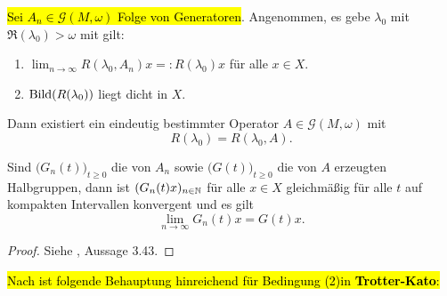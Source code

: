 \begin{fsatz}\label{Trotter-Kato}
\hl{Sei $A_n\in \mathcal G(M,\omega)$ Folge von Generatoren}. Angenommen, es gebe $\lambda_0$ mit $\mathfrak R(\lambda_0) >\omega$ mit gilt:
\begin{enumerate}
\item $\lim_{n\to\infty}R(\lambda_0, A_n)x =:R(\lambda_0)x$ für alle $x\in X$.
\item $\textnormal{Bild}(R(\lambda_0))$ liegt dicht in $X$.
\end{enumerate}
Dann existiert ein eindeutig bestimmter Operator $A\in\mathcal G(M, \omega)$ mit
\begin{equation*}
R(\lambda_0)=R(\lambda_0, A).
\end{equation*}

\par 
Sind $\big(G_n(t)\big)_{t\geq0}$ die von $A_n$ sowie $\big(G(t)\big)_{t\geq0}$ die von $A$ erzeugten Halbgruppen, dann ist $(G_n(t)x)_{n\in\mathbb{N}}$ für alle $x\in X$ gleichmäßig für alle $t$ auf kompakten Intervallen konvergent und es gilt
\begin{equation*}
\lim_{n\to\infty}G_n(t)x=G(t)x.
\end{equation*}
\end{fsatz}

\begin{proof}
Siehe \cite{banasiak_arlotti_2006}, Aussage  3.43.
\end{proof}



\hl{Nach ist folgende Behauptung hinreichend für Bedingung (2)in \textbf{Trotter-Kato}:}

